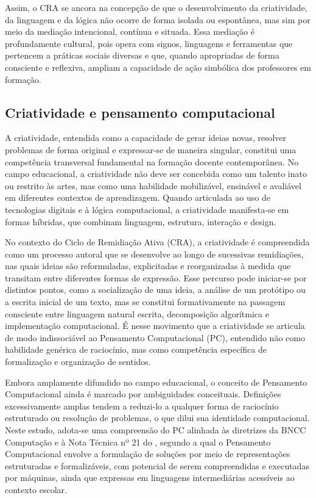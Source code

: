 \documentclass[portuguese]{textolivre}
\begin{document}
Assim, o CRA se ancora na concepção de que o desenvolvimento da criatividade, da linguagem e da lógica não ocorre de forma isolada ou espontânea, mas sim por meio da mediação intencional, contínua e situada. Essa mediação é profundamente cultural, pois opera com signos, linguagens e ferramentas que pertencem a práticas sociais diversas e que, quando apropriadas de forma consciente e reflexiva, ampliam a capacidade de ação simbólica dos professores em formação.

\subsection{Criatividade e pensamento computacional}

A criatividade, entendida como a capacidade de gerar ideias novas, resolver problemas de forma original e expressar-se de maneira singular, constitui uma competência transversal fundamental na formação docente contemporânea. No campo educacional, a criatividade não deve ser concebida como um talento inato ou restrito às artes, mas como uma habilidade mobilizável, ensinável e avaliável em diferentes contextos de aprendizagem. Quando articulada ao uso de tecnologias digitais e à lógica computacional, a criatividade manifesta-se em formas híbridas, que combinam linguagem, estrutura, interação e design.

No contexto do Ciclo de Remidiação Ativa (CRA), a criatividade é compreendida como um processo autoral que se desenvolve ao longo de sucessivas remidiações, nas quais ideias são reformuladas, explicitadas e reorganizadas à medida que transitam entre diferentes formas de expressão. Esse percurso pode iniciar-se por distintos pontos, como a socialização de uma ideia, a análise de um protótipo ou a escrita inicial de um texto, mas se constitui formativamente na passagem consciente entre linguagem natural escrita, decomposição algorítmica e implementação computacional. É nesse movimento que a criatividade se articula de modo indissociável ao Pensamento Computacional (PC), entendido não como habilidade genérica de raciocínio, mas como competência específica de formalização e organização de sentidos.

Embora amplamente difundido no campo educacional, o conceito de Pensamento Computacional ainda é marcado por ambiguidades conceituais. Definições excessivamente amplas tendem a reduzi-lo a qualquer forma de raciocínio estruturado ou resolução de problemas, o que dilui sua identidade computacional. Neste estudo, adota-se uma compreensão do PC alinhada às diretrizes da BNCC Computação \cite{cne2022} e à Nota Técnica nº 21 do \textcite{cieb2024}, segundo a qual o Pensamento Computacional envolve a formulação de soluções por meio de representações estruturadas e formalizáveis, com potencial de serem compreendidas e executadas por máquinas, ainda que expressas em linguagens intermediárias acessíveis ao contexto escolar.
\end{document}
